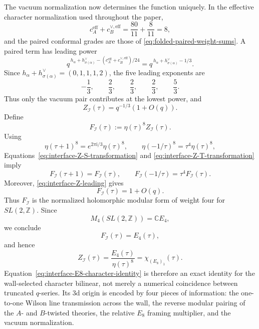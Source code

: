 \documentclass[11pt,a4paper]{article}
\numberwithin{equation}{section}
\begin{document}
The vacuum normalization now determines the function uniquely.  In the effective character normalization used throughout the paper,
\begin{equation}
  c_A^{\mathrm{eff}}+c_B^{\vee,\mathrm{eff}}
  =\frac{80}{11}+\frac8{11}=8,
  \label{eq:interface-effective-c-sum}
\end{equation}
and the paired conformal grades are those of \eqref{eq:folded-paired-weight-sums}.  A paired term has leading power
\[
  q^{\,h_\alpha+h^\vee_{\sigma(\alpha)}
  -(c_A^{\mathrm{eff}}+c_B^{\vee,\mathrm{eff}})/24}
  =q^{\,h_\alpha+h^\vee_{\sigma(\alpha)}-1/3}.
\]
Since $h_\alpha+h^\vee_{\sigma(\alpha)}=(0,1,1,1,2)$, the five leading exponents are
\[
  -\frac13,\qquad \frac23,\qquad \frac23,\qquad \frac23,\qquad \frac53.
\]
Thus only the vacuum pair contributes at the lowest power, and
\begin{equation}
  Z_{\mathcal I}(\tau)
  =q^{-1/3}\left(1+O(q)\right).
  \label{eq:interface-Z-leading}
\end{equation}
Define
\begin{equation}
  F_{\mathcal I}(\tau)
  :=\eta(\tau)^8 Z_{\mathcal I}(\tau).
  \label{eq:interface-F-definition}
\end{equation}
Using
\begin{equation}
  \eta(\tau+1)^8=e^{2\pi \mathrm{i}/3}\eta(\tau)^8,
  \qquad
  \eta(-1/\tau)^8=\tau^4\eta(\tau)^8,
\end{equation}
Equations~\eqref{eq:interface-Z-S-transformation} and \eqref{eq:interface-Z-T-transformation} imply
\begin{equation}
  F_{\mathcal I}(\tau+1)=F_{\mathcal I}(\tau),
  \qquad
  F_{\mathcal I}(-1/\tau)=\tau^4F_{\mathcal I}(\tau).
  \label{eq:interface-F-modularity}
\end{equation}
Moreover, \eqref{eq:interface-Z-leading} gives
\begin{equation}
  F_{\mathcal I}(\tau)=1+O(q).
  \label{eq:interface-F-normalization}
\end{equation}
Thus $F_{\mathcal I}$ is the normalized holomorphic modular form of weight four for $SL(2,\mathbb Z)$.  Since
\begin{equation}
  M_4\!\left(SL(2,\mathbb Z)\right)=\mathbb C E_4,
\end{equation}
we conclude
\begin{equation}
  F_{\mathcal I}(\tau)=E_4(\tau),
\end{equation}
and hence
\begin{equation}
  Z_{\mathcal I}(\tau)
  =\frac{E_4(\tau)}{\eta(\tau)^8}
  =\chi_{(E_8)_1}(\tau).
  \label{eq:interface-E8-character-identity}
\end{equation}
Equation~\eqref{eq:interface-E8-character-identity} is therefore an exact identity for the wall-selected character bilinear, not merely a numerical coincidence between truncated $q$-series.  Its 3d origin is encoded by four pieces of information: the one-to-one Wilson line transmission across the wall, the reverse modular pairing of the $A$- and $B$-twisted theories, the relative $E_8$ framing multiplier, and the vacuum normalization.
\end{document}
